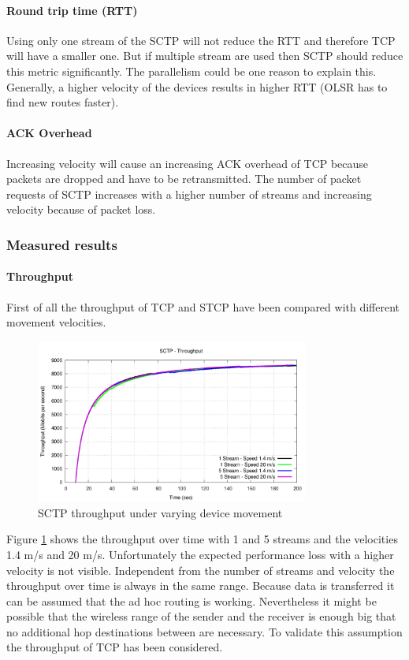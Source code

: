 \documentclass[a4paper]{article}
\begin{document}
\paragraph{Round trip time (RTT)}
Using only one stream of the SCTP will not reduce the RTT and therefore TCP will have a smaller one. But if multiple stream are used then SCTP should reduce this metric significantly. The parallelism could be one reason to explain this. Generally, a higher velocity of the devices results in higher RTT (OLSR has to find new routes faster).
\paragraph{ACK Overhead}
Increasing velocity will cause an increasing ACK overhead of TCP because packets are dropped and have to be retransmitted. The number of packet requests of SCTP increases with a higher number of streams and increasing velocity because of packet loss.

\subsubsection{Measured results}

\paragraph{Throughput}

First of all the throughput of TCP and STCP have been compared with different movement velocities. 

\begin{figure}[H]
	\centering
	\includegraphics[width=0.8\textwidth]{imgs/sctp-throughput.png}
	\caption{SCTP throughput under varying device movement}
	\label{fig:sctp-throughput}
\end{figure}

Figure \ref{fig:sctp-throughput} shows the throughput over time with 1 and 5 streams and the velocities 1.4 m/s and 20 m/s. Unfortunately the expected performance loss with a higher velocity is not visible. Independent from the number of streams and velocity the throughput over time is always in the same range. Because data is transferred it can be assumed that the ad hoc routing is working. Nevertheless it might be possible that the wireless range of the sender and the receiver is enough big that no additional hop destinations between are necessary. To validate this assumption the throughput of TCP has been considered.
\end{document}
